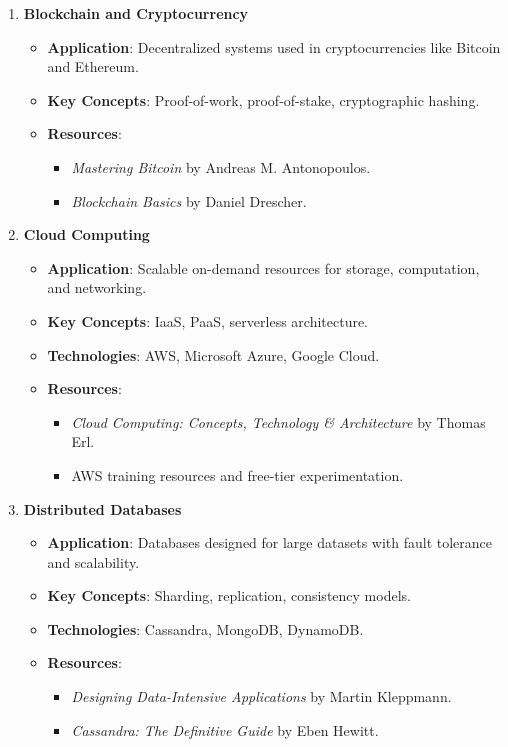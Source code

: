 \documentclass{article}
\begin{document}
\begin{enumerate}
    \item \textbf{Blockchain and Cryptocurrency}
    \begin{itemize}
        \item \textbf{Application}: Decentralized systems used in cryptocurrencies like Bitcoin and Ethereum.
        \item \textbf{Key Concepts}: Proof-of-work, proof-of-stake, cryptographic hashing.
        \item \textbf{Resources}:
        \begin{itemize}
            \item \textit{Mastering Bitcoin} by Andreas M. Antonopoulos.
            \item \textit{Blockchain Basics} by Daniel Drescher.
        \end{itemize}
    \end{itemize}

    \item \textbf{Cloud Computing}
    \begin{itemize}
        \item \textbf{Application}: Scalable on-demand resources for storage, computation, and networking.
        \item \textbf{Key Concepts}: IaaS, PaaS, serverless architecture.
        \item \textbf{Technologies}: AWS, Microsoft Azure, Google Cloud.
        \item \textbf{Resources}:
        \begin{itemize}
            \item \textit{Cloud Computing: Concepts, Technology \& Architecture} by Thomas Erl.
            \item AWS training resources and free-tier experimentation.
        \end{itemize}
    \end{itemize}

    \item \textbf{Distributed Databases}
    \begin{itemize}
        \item \textbf{Application}: Databases designed for large datasets with fault tolerance and scalability.
        \item \textbf{Key Concepts}: Sharding, replication, consistency models.
        \item \textbf{Technologies}: Cassandra, MongoDB, DynamoDB.
        \item \textbf{Resources}:
        \begin{itemize}
            \item \textit{Designing Data-Intensive Applications} by Martin Kleppmann.
            \item \textit{Cassandra: The Definitive Guide} by Eben Hewitt.
        \end{itemize}
    \end{itemize}


\end{enumerate}
\end{document}
